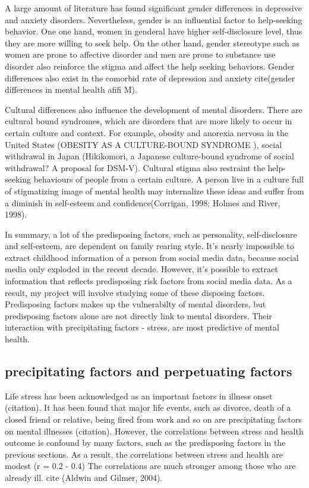 A large amount of literature has found significant gender differences in depressive and anxiety disorders. Nevertheless, gender is an influential factor to help-seeking behavior. One one hand, women in genderal have higher self-disclosure level, thus they are more willing to seek help. On the other hand, gender stereotype such as women are prone to affective disorder and men are prone to substance use disorder also reinforce the stigma and affect the help seeking behaviors. Gender differences also exist in the comorbid rate of depression and anxiety cite(gender differences in mental health afifi M). 

Cultural differences also influence the development of mental disorders. There are cultural bound syndromes, which are disorders that are more likely to occur in certain culture and context. For example, obesity and anorexia nervosa in the United States (OBESITY AS A CULTURE-BOUND SYNDROME ), social withdrawal in Japan (Hikikomori, a Japanese culture-bound syndrome of social withdrawal? A proposal for DSM-V). Cultural stigma also restraint the help-seeking behaviours of people from a certain culture. A person live in a culture full of stigmatizing image of mental health may internalize these ideas and suffer from a diminish in self-esteem and confidence(Corrigan, 1998; Holmes and River, 1998). 

In summary, a lot of the predisposing factors, such as personality, self-disclosure and self-esteem, are dependent on family rearing style. It's nearly impossible to extract childhood information of a person from social media data, because social media only exploded in the recent decade. However, it's possible to extract information that reflects predisposing risk factors from social media data. As a result, my project will involve studying some of these disposing factors. Predisposing factors makes up the vulnerabilty of mental disorders, but predisposing factors alone are not directly link to mental disorders. Their interaction with precipitating factors - stress, are most predictive of mental health.


\subsection{precipitating factors and perpetuating factors}

Life stress has been acknowledged as an important factors in illness onset (citation). It has been found that major life events, such as divorce, death of a closed friend or relative, being fired from work and so on are precipitating factors on mental illnesses (citation). However, the correlations between stress and health outcome is confound by many factors, such as the predisposing factors in the previous sections. As a result, the correlations between stress and health are modest (r =  0.2 - 0.4)  The correlations are much stronger among those who are already ill. cite (Aldwin and Gilmer, 2004).

